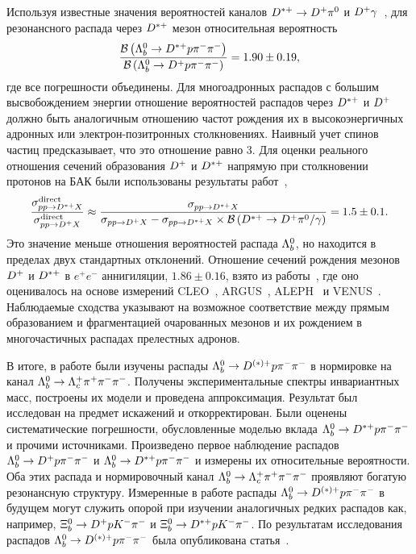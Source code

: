 Используя известные значения вероятностей каналов $\Dstarp\to\Dp\piz$ 
и ${D^+}\gamma$~\cite{PDG}, для резонансного распада через ${D^{*+}}$ мезон 
относительная вероятность
\[ \frac{\BR{\Lb\to\Dstarp\p\pim\pim}}{\BR{\Lb\to\Dp\p\pim\pim}}
  = 1.90 \pm 0.19, \]
где все погрешности объединены. Для многоадронных распадов с большим 
высвобождением энергии отношение вероятностей распадов через ${D^{*+}}$ 
и ${D^+}$ должно быть аналогичным отношению частот рождения их 
в высокоэнергичных адронных или электрон-позитронных столкновениях. 
Наивный учет спинов частиц предсказывает, что это отношение равно 3.
%
Для оценки реального отношения сечений образования ${D^+}$ и ${D^{*+}}$ 
напрямую при столкновении протонов на БАК были использованы результаты 
работ~\cite{lhcb-charm-prod-5tev, lhcb-charm-prod-7tev, 
lhcb-charm-prod-13tev},
\[
  \frac{\sigma^\text{direct}_{pp\to\Dstarp X}}
       {\sigma^\text{direct}_{pp\to\Dp X}} \approx
  \frac{\sigma_{pp\to\Dstarp X}}{
    \sigma_{pp\to\Dp X} - \sigma_{pp\to\Dstarp X}
    \times \BR{\Dstarp\to\Dp\piz/\gamma}
  }
  = 1.5 \pm 0.1.
\]
Это значение меньше отношения вероятностей распада ${\Lambda_b^0}$, но находится 
в пределах двух стандартных отклонений. Отношение сечений рождения 
мезонов ${D^+}$ и ${D^{*+}}$ в $e^+e^-$ аннигиляции, $1.86\pm0.16$, взято 
из работы~\cite{ee-charm-prod}, где оно оценивалось на основе измерений 
CLEO~\cite{ee-charm-prod-cleo}, ARGUS~\cite{ee-charm-prod-argus}, 
ALEPH~\cite{ee-charm-prod-aleph} и VENUS~\cite{ee-charm-prod-venus}. 
Наблюдаемые сходства указывают на возможное соответствие между прямым 
образованием и фрагментацией очарованных мезонов и их рождением 
в многочастичных распадах прелестных адронов.

\begingroup \par \sloppy
В итоге, в работе были изучены распады $\Lb\to\Doptstarp\p\pim\pim$ 
в нормировке на канал $\Lb\to\Lc\pip\pim\pim$. Получены 
экспериментальные спектры инвариантных масс, построены их модели 
и проведена аппроксимация. Результат был исследован на предмет искажений 
и откорректирован. Были оценены систематические погрешности, 
обусловленные моделью вклада $\Lb\to\Dstarp\p\pim\pim$ и прочими 
источниками. Произведено первое наблюдение распадов 
$\Lb\to\Dp\p\pim\pim$ и $\Lb\to\Dstarp\p\pim\pim$ и измерены их 
относительные вероятности. Оба этих распада и нормировочный канал 
$\Lb\to\Lc\pip\pim\pim$ проявляют богатую резонансную структуру.
%
Измеренные в работе распады $\Lb\to\Doptstarp\p\pim\pim$ в будущем могут 
служить опорой при изучении аналогичных редких распадов как, например, 
$\Xi_b^0\to\Dp\p\Km\pim$ и $\Xi_b^0\to\Dstarp\p\Km\pim$.
%
По результатам исследования распадов $\Lb\to\Doptstarp\p\pim\pim$ была 
опубликована статья~\cite{lb2dppipi-paper}.
\par \endgroup
